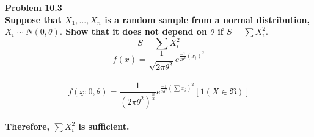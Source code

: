 
\bf{Problem 10.3}
\\ Suppose that $ X_{1},...,X_{n} $ is a random sample from a normal distribution, 
\\ $ X_{i} \sim N(0, \theta ). $ Show that it does not depend on $ \theta $ if $ S=\sum X_{i}^{2}. $  
\\ \[ S= \sum X_{i}^{2}\] \[ f(x)=\dfrac{1}{\sqrt{2 \pi \theta^{2}}}e^{ \frac{-1}{2 \theta^{2}}( x_{i})^{2}} \]
\\ \[ f( \underline{x} ;0, \theta )= \dfrac{1}{(2 \pi \theta^{2})^{\frac{n}{2}}}e^{\frac{-1}{2 \theta^{2}}(\sum x_{i})^{2}}[1(X \in \Re)] \] 
\\ Therefore, $ \sum X_{i}^{2} $ is sufficient.
